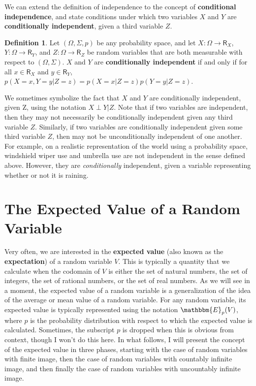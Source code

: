 \documentclass[11pt]{article}
\theoremstyle{definition}
\newtheorem{definition}[theorem]{Definition}
\theoremstyle{remark}
\begin{document}
We can extend the definition of independence to the concept of \textbf{conditional independence}, and state conditions under which two variables $X$ and $Y$ are \textbf{conditionally independent}, given a third variable $Z$.
\begin{definition}
    Let $(\Omega,\Sigma,p)$ be any probability space, and let $X:\Omega\rightarrow\textsf{R}_{X}$, $Y:\Omega\rightarrow\textsf{R}_{Y}$, and $Z:\Omega\rightarrow\textsf{R}_{Z}$ be random variables that are both measurable with respect to $(\Omega,\Sigma)$. $X$ and $Y$ are \textbf{conditionally independent} if and only if for all $x\in\textsf{R}_{X}$ and $y\in\textsf{R}_{Y}$, $p(X=x,Y=y|Z=z)=p(X=x|Z=z)p(Y=y|Z=z)$.
\end{definition}
\noindent
We sometimes symbolize the fact that $X$ and $Y$ are conditionally independent, given Z, using the notation $X\perp Y|Z$. Note that if two variables are independent, then they may not necessarily be conditionally independent given any third variable $Z$. Similarly, if two variables are conditionally independent given some third variable $Z$, then may not be unconditionally independent of one another. For example, on a realistic representation of the world using a probability space, windshield wiper use and umbrella use are not independent in the sense defined above. However, they are \textit{conditionally} independent, given a variable representing whether or not it is raining.\par 



\section{The Expected Value of a Random Variable}
Very often, we are interested in the \textbf{expected value} (also known as the \textbf{expectation}) of a random variable $V$. This is typically a quantity that we calculate when the codomain of $V$ is either the set of natural numbers, the set of integers, the set of rational numbers, or the set of real numbers. As we will see in a moment, the expected value of a random variable is a generalization of the idea of the average or mean value of a random variable. For any random variable, its expected value is typically represented using the notation $\mathbbm{E}_{p}(V)$, where $p$ is the probability distribution with respect to which the expected value is calculated. Sometimes, the subscript $p$ is dropped when this is obvious from context, though I won't do this here. In what follows, I will present the concept of the expected value in three phases, starting with the case of random variables with finite image, then the case of random variables with countably infinite image, and then finally the case of random variables with uncountably infinite image.
\end{document}
